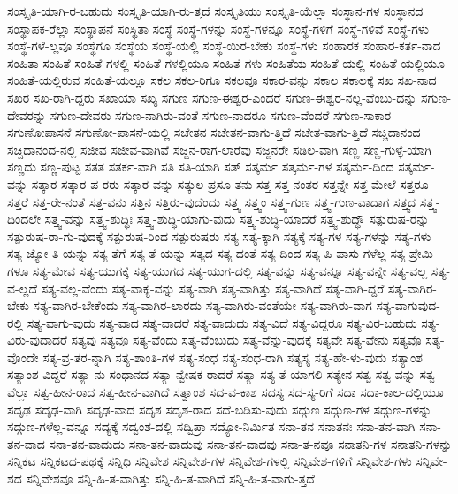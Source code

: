 {ಸಂಸ್ಕೃತಿ-ಯಾಗಿ-ರ-ಬಹುದು
ಸಂಸ್ಕೃತಿ-ಯಾಗಿ-ರು-ತ್ತದೆ
ಸಂಸ್ಕೃತಿಯು
ಸಂಸ್ಕೃತಿ-ಯೆಲ್ಲಾ
ಸಂಸ್ಥಾನ-ಗಳ
ಸಂಸ್ಥಾನದ
ಸಂಸ್ಥಾಪಕ-ರೆಲ್ಲಾ
ಸಂಸ್ಥಾಪನೆ
ಸಂಸ್ಥಿತಾ
ಸಂಸ್ಥೆ
ಸಂಸ್ಥೆ-ಗಳನ್ನು
ಸಂಸ್ಥೆ-ಗಳನ್ನೂ
ಸಂಸ್ಥೆ-ಗಳಿಗೆ
ಸಂಸ್ಥೆ-ಗಳಿವೆ
ಸಂಸ್ಥೆ-ಗಳು
ಸಂಸ್ಥೆ-ಗಳೆ-ಲ್ಲವೂ
ಸಂಸ್ಥೆಗೂ
ಸಂಸ್ಥೆಯ
ಸಂಸ್ಥೆ-ಯಲ್ಲಿ
ಸಂಸ್ಥೆ-ಯಿರ-ಬೇಕು
ಸಂಸ್ಧೆ-ಗಳು
ಸಂಹಾರಕ
ಸಂಹಾರ-ಕರ್ತ-ನಾದ
ಸಂಹಿತಾ
ಸಂಹಿತೆ
ಸಂಹಿತೆ-ಗಳಲ್ಲಿ
ಸಂಹಿತೆ-ಗಳಲ್ಲಿಯೂ
ಸಂಹಿತೆ-ಗಳು
ಸಂಹಿತೆಯ
ಸಂಹಿತೆ-ಯಲ್ಲಿ
ಸಂಹಿತೆ-ಯಲ್ಲಿಯೂ
ಸಂಹಿತೆ-ಯಲ್ಲಿರುವ
ಸಂಹಿತೆ-ಯಲ್ಲೂ
ಸಕಲ
ಸಕಲ-ರಿಗೂ
ಸಕಲವೂ
ಸಕಾರ-ವನ್ನು
ಸಕಾಲ
ಸಕಾಲಕ್ಕೆ
ಸಖ
ಸಖ-ನಾದ
ಸಖರ
ಸಖ-ರಾಗಿ-ದ್ದರು
ಸಖಾಯಾ
ಸಖ್ಯ
ಸಗುಣ
ಸಗುಣ-ಈಶ್ವರ-ಎಂದರೆ
ಸಗುಣ-ಈಶ್ವರ-ನಲ್ಲ-ವೆಂಬು-ದನ್ನು
ಸಗುಣ-ದೇವರನ್ನು
ಸಗುಣ-ದೇವರು
ಸಗುಣ-ನಾಗಿರು-ವಂತೆ
ಸಗುಣ-ನಾದರೂ
ಸಗುಣ-ವೆಂದರೆ
ಸಗುಣ-ಸಾಕಾರ
ಸಗುಣೋಪಾಸನೆ
ಸಗುಣೋ-ಪಾಸನೆ-ಯಲ್ಲಿ
ಸಚೇತನ
ಸಚೇತನ-ವಾಗು-ತ್ತಿದೆ
ಸಚೇತ-ವಾಗು-ತ್ತಿದೆ
ಸಚ್ಚಿದಾನಂದ
ಸಚ್ಚಿದಾನಂದ-ನಲ್ಲಿ
ಸಜೀವ
ಸಜೀವ-ವಾಗಿವೆ
ಸಜ್ಜನ-ರಾಗ-ಲಾರೆವು
ಸಜ್ಜನರೇ
ಸಡಿಲ-ವಾಗಿ
ಸಣ್ಣ
ಸಣ್ಣ-ಗುಳ್ಳೆ-ಯಾಗಿ
ಸಣ್ಣದು
ಸಣ್ಣ-ಪುಟ್ಟ
ಸತತ
ಸತರ್ಕ-ವಾಗಿ
ಸತಿ
ಸತಿ-ಯಾಗಿ
ಸತ್
ಸತ್ಕರ್ಮ
ಸತ್ಕರ್ಮ-ಗಳ
ಸತ್ಕರ್ಮ-ದಿಂದ
ಸತ್ಕರ್ಮ-ವನ್ನು
ಸತ್ಕಾರ
ಸತ್ಕಾರ-ಪ-ರರು
ಸತ್ಕಾರ-ವನ್ನು
ಸತ್ಕುಲ-ಪ್ರಸೂ-ತನು
ಸತ್ತ
ಸತ್ತ-ನಂತರ
ಸತ್ತನ್ನೇ
ಸತ್ತ-ಮೇಲೆ
ಸತ್ತರೂ
ಸತ್ತರೆ
ಸತ್ತ-ರೇ-ನಂತೆ
ಸತ್ತ-ವನು
ಸತ್ತಿನ
ಸತ್ತಿರು-ವುದೆಂದು
ಸತ್ತ್ವ
ಸತ್ತ್ವಂ
ಸತ್ತ್ವ-ಗುಣ
ಸತ್ತ್ವ-ಗುಣ-ವಾದಾಗ
ಸತ್ತ್ವದ
ಸತ್ತ್ವ-ದಿಂದಲೇ
ಸತ್ತ್ವ-ವನ್ನು
ಸತ್ತ್ವ-ಶುದ್ಧಿಃ
ಸತ್ತ್ವ-ಶುದ್ಧಿ-ಯಾಗು-ವುದು
ಸತ್ತ್ವ-ಶುದ್ಧಿ-ಯಾದರೆ
ಸತ್ತ್ವ-ಶುದ್ಧೌ
ಸತ್ಪುರುಷ-ರನ್ನು
ಸತ್ಪುರುಷ-ರಾ-ಗು-ವುದಕ್ಕೆ
ಸತ್ಪುರುಷ-ರಿಂದ
ಸತ್ಪುರುಷರು
ಸತ್ಯ
ಸತ್ಯ-ಕ್ಕಾಗಿ
ಸತ್ಯಕ್ಕೆ
ಸತ್ಯ-ಗಳ
ಸತ್ಯ-ಗಳನ್ನು
ಸತ್ಯ-ಗಳು
ಸತ್ಯ-ಜ್ಯೋ-ತಿ-ಯನ್ನು
ಸತ್ಯ-ತೆಗೆ
ಸತ್ಯ-ತೆ-ಯನ್ನು
ಸತ್ಯದ
ಸತ್ಯ-ದಂತೆ
ಸತ್ಯ-ದಿಂದ
ಸತ್ಯ-ಪಿ-ಪಾಸು-ಗಳೆಲ್ಲ
ಸತ್ಯ-ಪ್ರೇಮಿ-ಗಳೂ
ಸತ್ಯ-ಮೇವ
ಸತ್ಯ-ಯುಗಕ್ಕೆ
ಸತ್ಯ-ಯುಗದ
ಸತ್ಯ-ಯುಗ-ದಲ್ಲಿ
ಸತ್ಯ-ವನ್ನು
ಸತ್ಯ-ವನ್ನೂ
ಸತ್ಯ-ವನ್ನೇ
ಸತ್ಯ-ವಲ್ಲ
ಸತ್ಯ-ವ-ಲ್ಲದೆ
ಸತ್ಯ-ವಲ್ಲ-ವೆಂದು
ಸತ್ಯ-ವಾಕ್ಯ-ವನ್ನು
ಸತ್ಯ-ವಾಗಿ
ಸತ್ಯ-ವಾಗಿತ್ತು
ಸತ್ಯ-ವಾಗಿದೆ
ಸತ್ಯ-ವಾಗಿ-ದ್ದರೆ
ಸತ್ಯ-ವಾಗಿರ-ಬೇಕು
ಸತ್ಯ-ವಾಗಿರ-ಬೇಕೆಂದು
ಸತ್ಯ-ವಾಗಿರ-ಲಾರದು
ಸತ್ಯ-ವಾಗಿರು-ವಂತೆಯೇ
ಸತ್ಯ-ವಾಗಿರು-ವಾಗ
ಸತ್ಯ-ವಾಗುವುದ-ರಲ್ಲಿ
ಸತ್ಯ-ವಾಗು-ವುದು
ಸತ್ಯ-ವಾದ
ಸತ್ಯ-ವಾದರೆ
ಸತ್ಯ-ವಾದುದು
ಸತ್ಯ-ವಿದೆ
ಸತ್ಯ-ವಿದ್ದರೂ
ಸತ್ಯ-ವಿರ-ಬಹುದು
ಸತ್ಯ-ವಿರು-ವುದಾದರೆ
ಸತ್ಯವು
ಸತ್ಯವೂ
ಸತ್ಯ-ವೆಂದು
ಸತ್ಯ-ವೆಂಬುದು
ಸತ್ಯ-ವೆನ್ನು-ವುದಕ್ಕೆ
ಸತ್ಯವೇ
ಸತ್ಯ-ವೇನು
ಸತ್ಯವೊ
ಸತ್ಯ-ವೊಂದೇ
ಸತ್ಯ-ವ್ರ-ತರ-ನ್ನಾಗಿ
ಸತ್ಯ-ಶಾಂತಿ-ಗಳ
ಸತ್ಯ-ಸಂಧ
ಸತ್ಯ-ಸಂಧ-ರಾಗಿ
ಸತ್ಯಸ್ಯ
ಸತ್ಯ-ಹೇ-ಳು-ವುದು
ಸತ್ಯಾಂಶ
ಸತ್ಯಾಂಶ-ವಿದ್ದರೆ
ಸತ್ಯಾ-ನು-ಸಂಧಾನದ
ಸತ್ಯಾ-ನ್ವೇಷಕ-ರಾದರೆ
ಸತ್ಯಾ-ಸತ್ಯ-ತೆ-ಯಾಗಲಿ
ಸತ್ಯೇನ
ಸತ್ವ
ಸತ್ವ-ವನ್ನು
ಸತ್ವ-ವೆಲ್ಲಾ
ಸತ್ವ-ಹೀನ-ರಾದ
ಸತ್ವ-ಹೀನ-ವಾಗಿದೆ
ಸತ್ವಾಂಶ
ಸದ-ವ-ಕಾಶ
ಸದಸ್ಯ
ಸದ-ಸ್ಯ-ರಿಗೆ
ಸದಾ
ಸದಾ-ಕಾಲ-ದಲ್ಲಿಯೂ
ಸದೃಢ
ಸದೃಢ-ವಾಗಿ
ಸದೃಢ-ವಾದ
ಸದೃಶ
ಸದೃಶ-ರಾದ
ಸದೆ-ಬಡಿಸು-ವುದು
ಸದ್ಗುಣ
ಸದ್ಗುಣ-ಗಳ
ಸದ್ಗುಣ-ಗಳನ್ನು
ಸದ್ಗುಣ-ಗಳೆಲ್ಲ-ವನ್ನೂ
ಸದ್ಯಕ್ಕೆ
ಸದ್ವಂಶ-ದಲ್ಲಿ
ಸದ್ವಿಪ್ರಾ
ಸದ್ಯೋ-ನಿರ್ಮಿತ
ಸನಾ-ತನ
ಸನಾತನಃ
ಸನಾ-ತನ-ವಾಗಿ
ಸನಾ-ತನ-ವಾದ
ಸನಾ-ತನ-ವಾದುದು
ಸನಾ-ತನ-ವಾದುವು
ಸನಾ-ತನ-ವಾದವು
ಸನಾ-ತ-ನವೂ
ಸನಾತನಿ-ಗಳ
ಸನಾತನಿ-ಗಳನ್ನು
ಸನ್ನಿಕಟ
ಸನ್ನಿಕಟದ-ಪಥಕ್ಕೆ
ಸನ್ನಿಧಿ
ಸನ್ನಿವೇಶ
ಸನ್ನಿವೇಶ-ಗಳ
ಸನ್ನಿವೇಶ-ಗಳಲ್ಲಿ
ಸನ್ನಿವೇಶ-ಗಳಿಗೆ
ಸನ್ನಿವೇಶ-ಗಳು
ಸನ್ನಿವೇ-ಶದ
ಸನ್ನಿವೇಶವೂ
ಸನ್ನಿ-ಹಿ-ತ-ವಾಗಿತ್ತು
ಸನ್ನಿ-ಹಿ-ತ-ವಾಗಿದೆ
ಸನ್ನಿ-ಹಿ-ತ-ವಾಗು-ತ್ತದೆ
}
